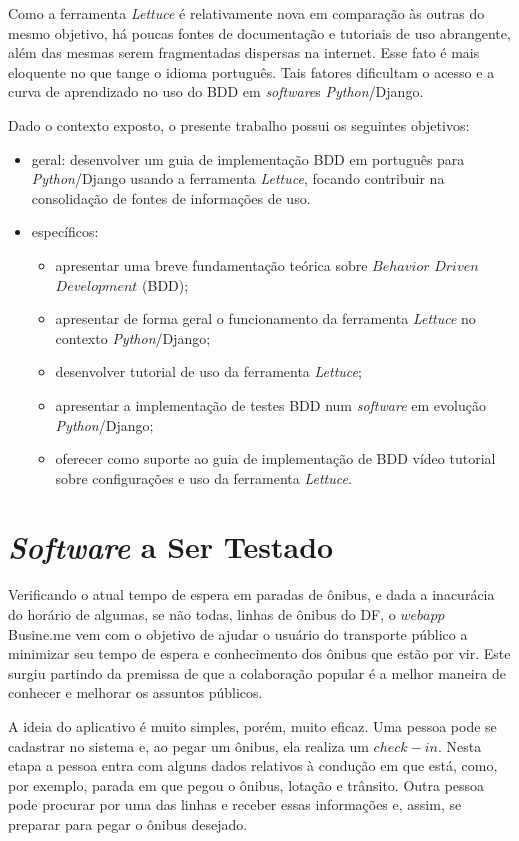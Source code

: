 Como a ferramenta \textit{Lettuce} é relativamente nova em comparação às outras do mesmo objetivo, há poucas fontes de documentação e tutoriais de uso abrangente, além das mesmas serem fragmentadas dispersas na internet. Esse fato é mais eloquente no que tange o idioma português. Tais fatores dificultam o acesso e a curva de aprendizado no uso do BDD em \textit{software}s \textit{Python}/Django.

Dado o contexto exposto, o presente trabalho possui os seguintes objetivos:
\begin{itemize}
	\item geral: desenvolver um guia de implementação BDD em português para \textit{Python}/Django usando a ferramenta \textit{Lettuce}, focando contribuir na consolidação de fontes de informações de uso.
	\item específicos:
		\begin{itemize}
			\item apresentar uma breve fundamentação teórica sobre $Behavior$ $Driven$ $Development$ (BDD);
			\item apresentar de forma geral o funcionamento da ferramenta \textit{Lettuce} no contexto \textit{Python}/Django;
			\item desenvolver tutorial de uso da ferramenta \textit{Lettuce};
			\item apresentar a implementação de testes BDD num \textit{software} em evolução \textit{Python}/Django;
			\item oferecer como suporte ao guia de implementação de BDD vídeo tutorial sobre configurações e uso da ferramenta \textit{Lettuce}.  
		\end{itemize}
\end{itemize}

\section{\textit{Software} a Ser Testado}

Verificando o atual tempo de espera em paradas de ônibus, e dada a inacurácia do horário de algumas, se não todas, linhas de ônibus do DF, o $webapp$ Busine.me vem com o objetivo de ajudar o usuário do transporte público a minimizar seu tempo de espera e conhecimento dos ônibus que estão por vir. Este surgiu partindo da premissa de que a colaboração popular é a melhor maneira de  conhecer e melhorar os assuntos públicos.

A ideia do aplicativo é muito simples, porém, muito eficaz. Uma pessoa pode se cadastrar no sistema e, ao pegar um ônibus, ela realiza um $check-in$. Nesta etapa a pessoa entra com alguns dados relativos à condução em que está, como, por exemplo, parada em que pegou o ônibus, lotação e trânsito. Outra pessoa pode procurar por uma das linhas e receber essas informações e, assim, se preparar para pegar o ônibus desejado.

